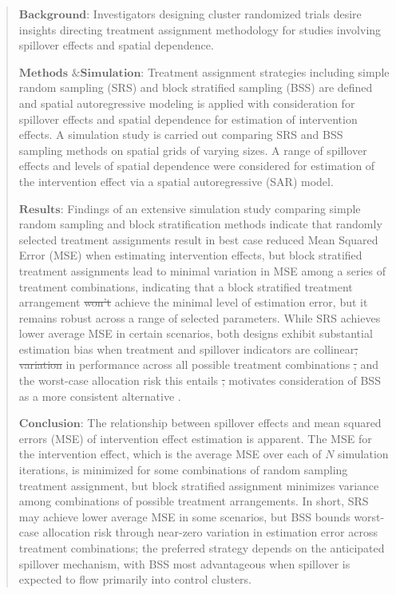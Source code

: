 \documentclass{article}[11pt]
\makeatletter
\providecommand{\DIFaddtex}[1]{{\protect\color{blue}\uwave{#1}}} %
\providecommand{\DIFdeltex}[1]{{\protect\color{red}\sout{#1}}} %
\providecommand{\DIFaddbegin}{} %
\providecommand{\DIFaddend}{} %
\providecommand{\DIFdelbegin}{} %
\providecommand{\DIFdelend}{} %
\providecommand{\DIFadd}[1]{\texorpdfstring{\DIFaddtex{#1}}{#1}} %
\providecommand{\DIFdel}[1]{\texorpdfstring{\DIFdeltex{#1}}{}} %
\providecommand{\DIFscaledelfig}{0.5}
\newlength{\DIFdelgraphicswidth} %
\newlength{\DIFdelgraphicsheight} %
\providecommand{\DIFaddincludegraphics}[2][]{{\color{blue}\fbox{\DIFOincludegraphics[#1]{#2}}}} %
\providecommand{\DIFdelincludegraphics}[2][]{%
\sbox{\DIFdelgraphicsbox}{\DIFOincludegraphics[#1]{#2}}%
\settoboxwidth{\DIFdelgraphicswidth}{\DIFdelgraphicsbox} %
\settoboxtotalheight{\DIFdelgraphicsheight}{\DIFdelgraphicsbox} %
\scalebox{\DIFscaledelfig}{%
\parbox[b]{\DIFdelgraphicswidth}{\usebox{\DIFdelgraphicsbox}\\[-\baselineskip] \rule{\DIFdelgraphicswidth}{0em}}\llap{\resizebox{\DIFdelgraphicswidth}{\DIFdelgraphicsheight}{%
\setlength{\unitlength}{\DIFdelgraphicswidth}%
\begin{picture}(1,1)%
\thicklines\linethickness{2pt} %
{\color[rgb]{1,0,0}\put(0,0){\framebox(1,1){}}}%
{\color[rgb]{1,0,0}\put(0,0){\line( 1,1){1}}}%
{\color[rgb]{1,0,0}\put(0,1){\line(1,-1){1}}}%
\end{picture}%
}\hspace*{3pt}}} %
} %
\DeclareRobustCommand{\DIFaddbegin}{\DIFOaddbegin \let\includegraphics\DIFaddincludegraphics} %
\DeclareRobustCommand{\DIFaddend}{\DIFOaddend \let\includegraphics\DIFOincludegraphics} %
\DeclareRobustCommand{\DIFdelbegin}{\DIFOdelbegin \let\includegraphics\DIFdelincludegraphics} %
\DeclareRobustCommand{\DIFdelend}{\DIFOaddend \let\includegraphics\DIFOincludegraphics} %
\let\sout@orig\sout %
\renewcommand{\sout}[1]{\ifmmode\text{\sout@orig{\ensuremath{#1}}}\else\sout@orig{#1}\fi} %
\makeatother
\begin{document}
\begin{abstract}
   $\textbf{Background}$: Investigators designing cluster randomized trials desire insights directing treatment assignment methodology for studies involving spillover effects and spatial dependence.

   $\textbf{Methods \& Simulation}$: Treatment assignment strategies including simple random sampling (SRS) and block stratified sampling (BSS) are defined and spatial autoregressive modeling is applied with consideration for spillover effects and spatial dependence for estimation of intervention effects. A simulation study is carried out comparing SRS and BSS sampling methods on spatial grids of varying sizes. A range of spillover effects and levels of spatial dependence were considered for estimation of the intervention effect via a spatial autoregressive (SAR) model.


   $\textbf{Results}$: Findings of an extensive simulation study comparing simple random sampling and block stratification methods indicate that randomly selected treatment assignments result in best case reduced Mean Squared Error (MSE) when estimating intervention effects, but block stratified treatment assignments lead to minimal variation in MSE among a series of treatment combinations, indicating that a block stratified treatment arrangement \DIFdelbegin \DIFdel{won’t }\DIFdelend \DIFaddbegin \DIFadd{will not }\DIFaddend achieve the minimal level of estimation error, but it remains robust across a range of selected parameters. While SRS achieves lower average MSE in certain scenarios, both designs exhibit substantial estimation bias when treatment and spillover indicators are collinear\DIFdelbegin \DIFdel{; variation }\DIFdelend \DIFaddbegin \DIFadd{. Variation }\DIFaddend in performance across all possible treatment combinations \DIFdelbegin \DIFdel{, }\DIFdelend and the worst-case allocation risk this entails \DIFdelbegin \DIFdel{, }\DIFdelend motivates consideration of BSS as a more consistent alternative \DIFaddbegin \DIFadd{design}\DIFaddend .


   $\textbf{Conclusion}$: The relationship between spillover effects and mean squared errors (MSE) of intervention effect estimation is apparent. The MSE for the intervention effect, which is the average MSE over each of $N$ simulation iterations, is minimized for some combinations of random sampling treatment assignment, but block stratified assignment minimizes variance among combinations of possible treatment arrangements. In short, SRS may achieve lower average MSE in some scenarios, but BSS bounds worst-case allocation risk through near-zero variation in estimation error across treatment combinations; the preferred strategy depends on the anticipated spillover mechanism, with BSS most advantageous when spillover is expected to flow primarily into control clusters.
\end{abstract}
\end{document}
